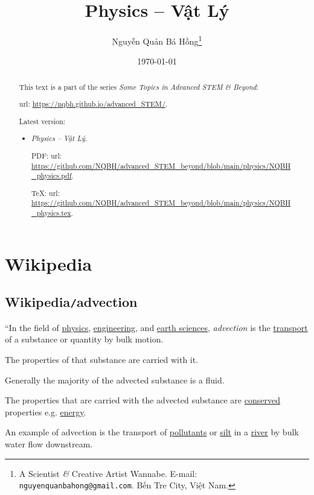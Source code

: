 \documentclass{article}
\title{Physics -- Vật Lý}
\author{Nguyễn Quản Bá Hồng\footnote{A Scientist {\it\&} Creative Artist Wannabe. E-mail: {\tt nguyenquanbahong@gmail.com}. Bến Tre City, Việt Nam.}}
\date{\today}
\begin{document}
\maketitle
\begin{abstract}
	This text is a part of the series {\it Some Topics in Advanced STEM \& Beyond}:
	
	{\sc url}: \url{https://nqbh.github.io/advanced_STEM/}.
	
	Latest version:
	\begin{itemize}
		\item {\it Physics -- Vật Lý}.
		
		PDF: {\sc url}: \url{https://github.com/NQBH/advanced_STEM_beyond/blob/main/physics/NQBH_physics.pdf}.
		
		\TeX: {\sc url}: \url{https://github.com/NQBH/advanced_STEM_beyond/blob/main/physics/NQBH_physics.tex}.
	\end{itemize}
\end{abstract}
\tableofcontents


\section{Wikipedia}

\subsection{Wikipedia{\tt/}advection}
``In the field of \href{https://en.wikipedia.org/wiki/Physics}{physics}, \href{https://en.wikipedia.org/wiki/Engineering}{engineering}, and \href{https://en.wikipedia.org/wiki/Earth_science}{earth sciences}, \textit{advection} is the \href{https://en.wikipedia.org/wiki/Transport}{transport} of a substance or quantity by bulk motion.

The properties of that substance are carried with it.

Generally the majority of the advected substance is a fluid.

The properties that are carried with the advected substance are \href{https://en.wikipedia.org/wiki/Conservation_of_energy}{conserved} properties e.g. \href{https://en.wikipedia.org/wiki/Energy}{energy}.

An example of advection is the transport of \href{https://en.wikipedia.org/wiki/Pollutant}{pollutants} or \href{https://en.wikipedia.org/wiki/Silt}{silt} in a \href{https://en.wikipedia.org/wiki/River}{river} by bulk water flow downstream.
\end{document}
